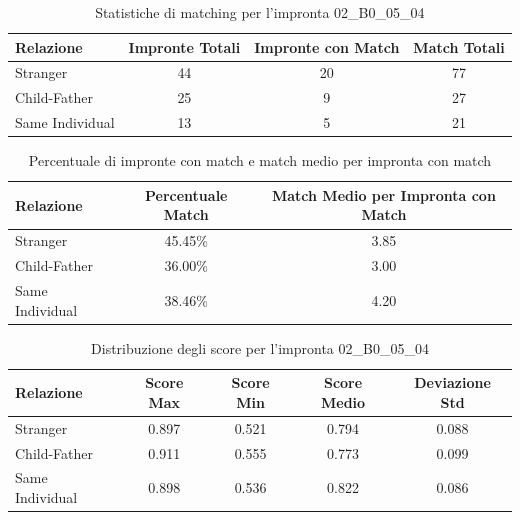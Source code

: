 \begin{table}[htbp]
\centering
\caption{Statistiche di matching per l'impronta 02\_B0\_05\_04}
\label{tab:results_02_B0_05_04}
\begin{tabular}{|l|c|c|c|}
\hline
\textbf{Relazione} & \textbf{Impronte Totali} & \textbf{Impronte con Match} & \textbf{Match Totali} \\
\hline
Stranger & 44 & 20 & 77 \\
\hline
Child-Father & 25 & 9 & 27 \\
\hline
Same Individual & 13 & 5 & 21 \\
\hline
\end{tabular}
\end{table}


\begin{table}[htbp]
\centering
\caption{Percentuale di impronte con match e match medio per impronta con match}
\label{tab:match_percentage_02_B0_05_04}
\begin{tabular}{|l|c|c|}
\hline
\textbf{Relazione} & \textbf{Percentuale Match} & \textbf{Match Medio per Impronta con Match} \\
\hline
Stranger & 45.45\% & 3.85 \\
\hline
Child-Father & 36.00\% & 3.00 \\
\hline
Same Individual & 38.46\% & 4.20 \\
\hline
\end{tabular}
\end{table}


\begin{table}[htbp]
\centering
\caption{Distribuzione degli score per l'impronta 02\_B0\_05\_04}
\label{tab:scores_02_B0_05_04}
\begin{tabular}{|l|c|c|c|c|}
\hline
\textbf{Relazione} & \textbf{Score Max} & \textbf{Score Min} & \textbf{Score Medio} & \textbf{Deviazione Std} \\
\hline
Stranger & 0.897 & 0.521 & 0.794 & 0.088 \\
\hline
Child-Father & 0.911 & 0.555 & 0.773 & 0.099 \\
\hline
Same Individual & 0.898 & 0.536 & 0.822 & 0.086 \\
\hline
\end{tabular}
\end{table}

